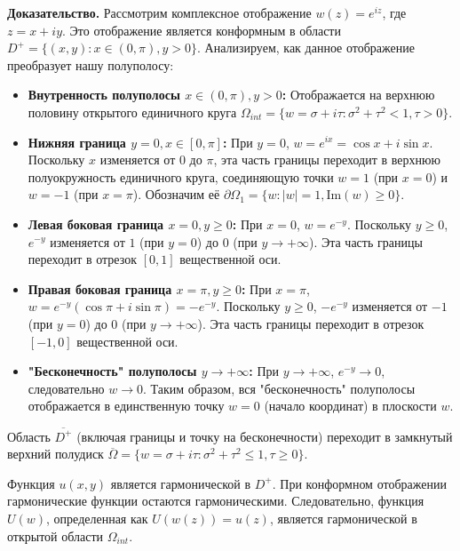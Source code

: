 \documentclass[12pt, a4paper]{article}
\begin{document}
\textbf{Доказательство.}
Рассмотрим комплексное отображение $w(z) = e^{iz}$, где $z = x+iy$. Это отображение является конформным в области $D^+ = \{(x,y): x \in (0,\pi), y > 0\}$. Анализируем, как данное отображение преобразует нашу полуполосу:
\begin{itemize}
	\item \textbf{Внутренность полуполосы $x \in (0,\pi), y > 0$:} Отображается на верхнюю половину открытого единичного круга $\Omega_{int} = \{w = \sigma + i\tau : \sigma^2 + \tau^2 < 1, \tau > 0\}$.
	\item \textbf{Нижняя граница $y=0, x \in [0,\pi]$:} При $y=0$, $w = e^{ix} = \cos x + i\sin x$. Поскольку $x$ изменяется от $0$ до $\pi$, эта часть границы переходит в верхнюю полуокружность единичного круга, соединяющую точки $w=1$ (при $x=0$) и $w=-1$ (при $x=\pi$). Обозначим её $\partial \Omega_1 = \{w : |w|=1, \mathrm{Im}(w) \ge 0\}$.
	\item \textbf{Левая боковая граница $x=0, y \ge 0$:} При $x=0$, $w = e^{-y}$. Поскольку $y \ge 0$, $e^{-y}$ изменяется от $1$ (при $y=0$) до $0$ (при $y \to +\infty$). Эта часть границы переходит в отрезок $[0,1]$ вещественной оси.
	\item \textbf{Правая боковая граница $x=\pi, y \ge 0$:} При $x=\pi$, $w = e^{-y}(\cos\pi + i\sin\pi) = -e^{-y}$. Поскольку $y \ge 0$, $-e^{-y}$ изменяется от $-1$ (при $y=0$) до $0$ (при $y \to +\infty$). Эта часть границы переходит в отрезок $[-1,0]$ вещественной оси.
	\item \textbf{"Бесконечность" полуполосы $y \to +\infty$:} При $y \to +\infty$, $e^{-y} \to 0$, следовательно $w \to 0$. Таким образом, вся "бесконечность" полуполосы отображается в единственную точку $w=0$ (начало координат) в плоскости $w$.
\end{itemize}
Область $\overline{D^+}$ (включая границы и точку на бесконечности) переходит в замкнутый верхний полудиск $\overline{\Omega} = \{w = \sigma + i\tau : \sigma^2 + \tau^2 \le 1, \tau \ge 0\}$.

Функция $u(x,y)$ является гармонической в $D^+$. При конформном отображении гармонические функции остаются гармоническими. Следовательно, функция $U(w)$, определенная как $U(w(z)) = u(z)$, является гармонической в открытой области $\Omega_{int}$.
\end{document}
